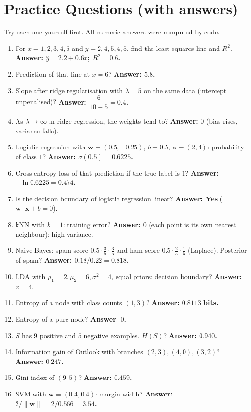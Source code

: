 \documentclass[11pt,a4paper]{article}
\newcommand{\bx}{\boldsymbol{x}}
\newcommand{\bw}{\boldsymbol{w}}
\newcommand{\norm}[1]{\lVert #1\rVert}
\begin{document}
\section{Practice Questions (with answers)}
Try each one yourself first. All numeric answers were computed by code.
\begin{enumerate}[leftmargin=*,itemsep=4pt]
\item For $x=1,2,3,4,5$ and $y=2,4,5,4,5$, find the least-squares line and $R^2$. \textbf{Answer: $\hat y=2.2+0.6x$; $R^2=0.6$.}
\item Prediction of that line at $x=6$? \textbf{Answer: $5.8$.}
\item Slope after ridge regularisation with $\lambda=5$ on the same data (intercept unpenalised)? \textbf{Answer: $\dfrac{6}{10+5}=0.4$.}
\item As $\lambda\to\infty$ in ridge regression, the weights tend to? \textbf{Answer: $0$} (bias rises, variance falls).
\item Logistic regression with $\bw=(0.5,-0.25)$, $b=0.5$, $\bx=(2,4)$: probability of class $1$? \textbf{Answer: $\sigma(0.5)=0.6225$.}
\item Cross-entropy loss of that prediction if the true label is $1$? \textbf{Answer: $-\ln0.6225=0.474$.}
\item Is the decision boundary of logistic regression linear? \textbf{Answer: Yes} ($\bw^\top\bx+b=0$).
\item kNN with $k=1$: training error? \textbf{Answer: $0$} (each point is its own nearest neighbour); high variance.
\item Naive Bayes: spam score $0.5\cdot\frac35\cdot\frac35$ and ham score $0.5\cdot\frac25\cdot\frac15$ (Laplace). Posterior of spam? \textbf{Answer: $0.18/0.22=0.818$.}
\item LDA with $\mu_1=2,\mu_2=6,\sigma^2=4$, equal priors: decision boundary? \textbf{Answer: $x=4$.}
\item Entropy of a node with class counts $(1,3)$? \textbf{Answer: $0.8113$ bits.}
\item Entropy of a pure node? \textbf{Answer: $0$.}
\item $S$ has $9$ positive and $5$ negative examples. $H(S)$? \textbf{Answer: $0.940$.}
\item Information gain of Outlook with branches $(2,3),(4,0),(3,2)$? \textbf{Answer: $0.247$.}
\item Gini index of $(9,5)$? \textbf{Answer: $0.459$.}
\item SVM with $\bw=(0.4,0.4)$: margin width? \textbf{Answer: $2/\norm{\bw}=2/0.566=3.54$.}

\end{enumerate}
\end{document}
